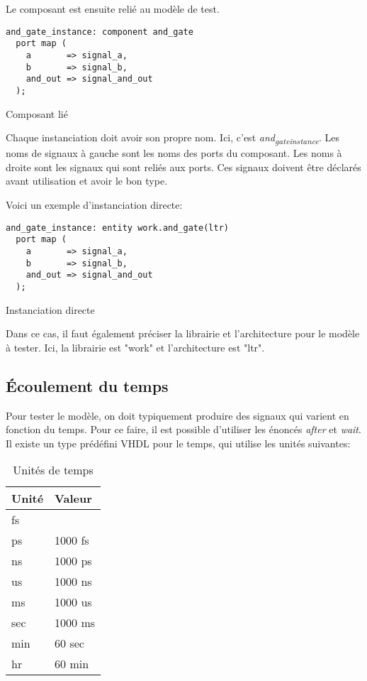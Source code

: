 \documentclass[11pt]{article}
\begin{document}
Le composant est ensuite relié au modèle de test. 

\begin{listing}[htbp]
\begin{verbatim}
and_gate_instance: component and_gate
  port map (
    a       => signal_a,
    b       => signal_b,
    and_out => signal_and_out
  );
\end{verbatim}
\caption{Composant lié}
\end{listing}

Chaque instanciation doit avoir son propre nom. Ici, c'est
\emph{and\textsubscript{gate}\textsubscript{instance}}. Les noms de signaux à gauche sont les noms des
ports du composant. Les noms à droite sont les signaux qui sont reliés
aux ports. Ces signaux doivent être déclarés avant utilisation et
avoir le bon type.

Voici un exemple d'instanciation directe:

\begin{listing}[htbp]
\begin{verbatim}
and_gate_instance: entity work.and_gate(ltr)
  port map (
    a       => signal_a,
    b       => signal_b,
    and_out => signal_and_out
  );
\end{verbatim}
\caption{Instanciation directe}
\end{listing}

Dans ce cas, il faut également préciser la librairie et l'architecture
pour le modèle à tester. Ici, la librairie est "work" et
l'architecture est "ltr".

\subsection{Écoulement du temps}
\label{sec:org5816eed}

Pour tester le modèle, on doit typiquement produire des signaux qui
varient en fonction du temps. Pour ce faire, il est possible
d'utiliser les énoncés \emph{after} et \emph{wait}. Il existe un type prédéfini
VHDL pour le temps, qui utilise les unités suivantes:

\begin{table}[htbp]
\caption{\label{tab:org6577c0f}Unités de temps}
\centering
\begin{tabular}{ll}
Unité & Valeur\\
\hline
fs & \\
ps & 1000 fs\\
ns & 1000 ps\\
us & 1000 ns\\
ms & 1000 us\\
sec & 1000 ms\\
min & 60 sec\\
hr & 60 min\\
\end{tabular}
\end{table}
\end{document}
